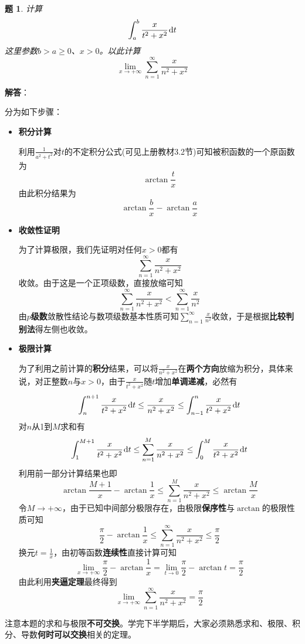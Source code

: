 \documentclass[a4paper,UTF8,fontset=windows,AutoFakeBold]{ctexart}
\newcommand*{\dr}{\hspace{0.07em}\mathrm{d}}
\newcommand*{\suminf}[1][n=1]{\sum_{#1}^\infty}
\newcommand*{\note}{\noindent *}
\theoremstyle{ex}
\newtheorem{exercise}{题}
\newcommand{\sol}[1]{{\vspace{5pt}\kaishu\noindent\textbf{解答}：\vspace{-3pt}
\begin{compactitem}
    \item[] #1
\end{compactitem}
}}
\begin{document}
\begin{framed}
\begin{exercise}
    计算
    $$\int_a^b\frac{x}{t^2+x^2}\dr t$$
    这里参数$b>a\ge0$、$x>0$。以此计算
    $$\lim_{x\to+\infty}\suminf\frac{x}{n^2+x^2}$$
\end{exercise}
\sol{
    分为如下步骤：
    \begin{itemize}
        \item \textbf{积分计算}
        
        利用$\frac{1}{a^2+t^2}$对$t$的不定积分公式(可见上册教材3.2节)可知被积函数的一个原函数为
        $$\arctan\frac{t}{x}$$
        由此积分结果为
        $$\arctan\frac{b}{x}-\arctan\frac{a}{x}$$

        \item \textbf{收敛性证明}
        
        为了计算极限，我们先证明对任何$x>0$都有
        $$\suminf\frac{x}{n^2+x^2}$$
        收敛。由于这是一个正项级数，直接放缩可知
        $$\suminf\frac{x}{n^2+x^2}<\suminf\frac{x}{n^2}$$
        由\textbf{$p$级数}敛散性结论与数项级数基本性质可知$\suminf\frac{x}{n^2}$收敛，于是根据\textbf{比较判别法}得左侧也收敛。

        \item \textbf{极限计算}
        
        为了利用之前计算的\textbf{积分}结果，可以将$\frac{x}{n^2+x^2}$在\textbf{两个方向}放缩为积分，具体来说，对正整数$n$与$x>0$，由于$\frac{x}{t^2+x^2}$随$t$增加\textbf{单调递减}，必然有
        $$\int_n^{n+1}\frac{x}{t^2+x^2}\dr t\le\frac{x}{n^2+x^2}\le\int_{n-1}^n\frac{x}{t^2+x^2}\dr t$$
        对$n$从1到$M$求和有
        $$\int_1^{M+1}\frac{x}{t^2+x^2}\dr t\le\sum_{n=1}^M\frac{x}{n^2+x^2}\le\int_0^M\frac{x}{t^2+x^2}\dr t$$
        利用前一部分计算结果也即
        $$\arctan\frac{M+1}{x}-\arctan\frac{1}{x}\le\sum_{n=1}^M\frac{x}{n^2+x^2}\le\arctan\frac{M}{x}$$
        令$M\to+\infty$，由于已知中间部分极限存在，由极限\textbf{保序性}与$\arctan$的极限性质可知
        $$\frac{\pi}{2}-\arctan\frac{1}{x}\le\suminf\frac{x}{n^2+x^2}\le\frac{\pi}{2}$$
        换元$t=\frac{1}{x}$，由初等函数\textbf{连续性}直接计算可知
        $$\lim_{x\to+\infty}\frac{\pi}{2}-\arctan\frac{1}{x}=\lim_{t\to0}\frac{\pi}{2}-\arctan t=\frac{\pi}{2}$$
        由此利用\textbf{夹逼定理}最终得到
        $$\lim_{x\to+\infty}\suminf\frac{x}{n^2+x^2}=\frac{\pi}{2}$$
    \end{itemize}
}
\end{framed}

\note 注意本题的求和与极限\textbf{不可交换}。学完下半学期后，大家必须熟悉求和、极限、积分、导数\textbf{何时可以交换}相关的定理。
\end{document}
